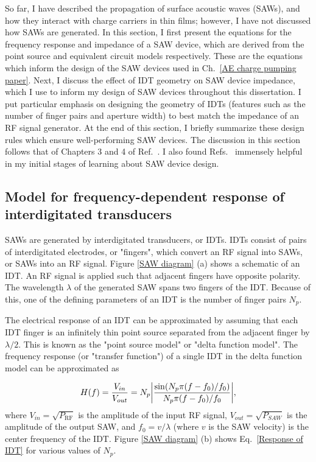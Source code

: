 \documentclass[double,12pt,1in,seploa]{beavtex}
\let\Oldsubsection\subsection
\renewcommand{\subsection}{\FloatBarrier\Oldsubsection}
\begin{document}
So far, I have described the propagation of surface acoustic waves (SAWs), and how they interact with charge carriers in thin films; however, I have not discussed how SAWs are generated. In this section, I first present the equations for the frequency response and impedance of a SAW device, which are derived from the point source and equivalent circuit models respectively. These are the equations which inform the design of the SAW devices used in Ch.\ \ref{AE charge pumping paper}. Next, I discuss the effect of IDT geometry on SAW device impedance, which I use to inform my design of SAW devices throughout this dissertation. I put particular emphasis on designing the geometry of IDTs (features such as the number of finger pairs and aperture width) to best match the impedance of an RF signal generator. At the end of this section, I briefly summarize these design rules which ensure well-performing SAW devices. The discussion in this section follows that of Chapters 3 and 4 of Ref.\ \cite{campbell_surface_1989}. I also found Refs.\ \cite{datta_surface_1986,lane_integrating_2021} immensely helpful in my initial stages of learning about SAW device design.

\subsection{Model for frequency-dependent response of interdigitated transducers}

SAWs are generated by interdigitated transducers, or IDTs. IDTs consist of pairs of interdigitated electrodes, or "fingers", which convert an RF signal into SAWs, or SAWs into an RF signal. Figure \ref{SAW diagram} (a) shows a schematic of an IDT. An RF signal is applied such that adjacent fingers have opposite polarity. The wavelength $\lambda$ of the generated SAW spans two fingers of the IDT. Because of this, one of the defining parameters of an IDT is the number of finger pairs $N_p$. 

The electrical response of an IDT can be approximated by assuming that each IDT finger is an infinitely thin point source separated from the adjacent finger by $\lambda/2$. This is known as the "point source model" or "delta function model". The frequency response (or "transfer function") of a single IDT in the delta function model can be approximated as \cite{campbell_surface_1989}

\begin{equation}
    \begin{split}
        H(f) = \frac{V_{in}}{V_{out}} = N_p \abs{\frac{\sin (N_p \pi (f-f_0) / f_0)}{N_p \pi (f-f_0) / f_0}},
    \end{split}
    \label{Response of IDT}
\end{equation}
where $V_{in} = \sqrt{P_{\mathrm{RF}}}$ is the amplitude of the input RF signal, $V_{out} = \sqrt{P_{SAW}}$ is the amplitude of the output SAW, and $f_0 = v/\lambda$ (where $v$ is the SAW velocity) is the center frequency of the IDT. Figure \ref{SAW diagram} (b) shows Eq.\ \ref{Response of IDT} for various values of $N_p$. 
\end{document}
